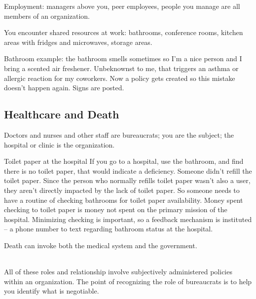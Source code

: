 Employment: managers above you, peer employees, people you manage are all members of an organization. 


You encounter shared resources at work: bathrooms, conference rooms, kitchen areas with fridges and microwaves, storage areas. 

Bathroom example: the bathroom smells sometimes so I'm a nice person and I bring a scented air freshener. Unbeknownst to me, that triggers an asthma or allergic reaction for my coworkers. Now a policy gets created so this mistake doesn't happen again. Signs are posted. 


\subsection{Healthcare and Death\label{sec:bureaucracy-of-death}}
Doctors and nurses and other staff are bureaucrats; you are the subject; the hospital or clinic is the organization. 


Toilet paper at the hospital
If you go to a hospital, use the bathroom, and find there is no toilet paper, that would indicate a deficiency.
Someone didn't refill the toilet paper. Since the person who normally refills toilet paper wasn't also a user, they aren't directly impacted by the lack of toilet paper.
So someone needs to have a routine of checking bathrooms for toilet paper availability. Money spent checking to toilet paper is money not spent on the primary mission of the hospital.
Minimizing checking is important, so a feedback mechanism is instituted -- a phone number to text regarding bathroom status at the hospital.



Death can invoke both the medical system and the government. 



\ \\

All of these roles and relationship involve subjectively administered policies within an organization. The point of recognizing the role of bureaucrats is to help you identify what is negotiable. 


